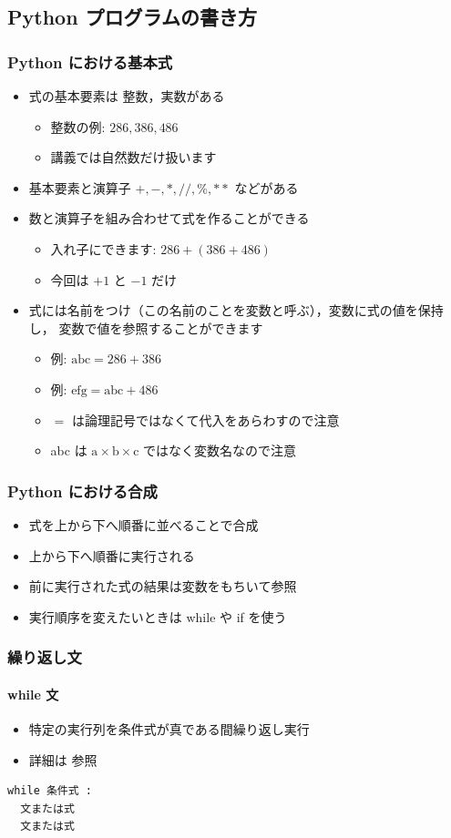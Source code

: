\subsection{Python プログラムの書き方}
\begin{frame}[fragile]
\frametitle{Python における基本式}
  \begin{itemize}
\item 式の基本要素は 整数，実数がある
    \begin{itemize}
\item 整数の例: \(286, 386, 486\) 
\item 講義では自然数だけ扱います
    \end{itemize}
\item 基本要素と演算子 \(+, -, *, \slash\slash, \%, **\) などがある
\item 数と演算子を組み合わせて式を作ることができる
    \begin{itemize}
\item 入れ子にできます: \(286+(386+486)\) 
\item 今回は \(+1\) と \(-1\) だけ
    \end{itemize}
\item 式には名前をつけ（この名前のことを変数と呼ぶ），変数に式の値を保持し，
変数で値を参照することができます
    \begin{itemize}
\item 例: \(\mbox{abc}=286+386\) 
\item 例: \(\mbox{efg}=\mbox{abc}+486\) 
\item $=$ は論理記号ではなくて代入をあらわすので注意
\item abc は \(\mbox{a}\times\mbox{b}\times\mbox{c}\) ではなく変数名なので注意
    \end{itemize}
  \end{itemize}
\end{frame}
\begin{frame}[label=composit]
\frametitle{Python における合成}
  \begin{itemize}
\item 式を上から下へ順番に並べることで合成
\item 上から下へ順番に実行される
\item 前に実行された式の結果は変数をもちいて参照
\item 実行順序を変えたいときは while や if を使う
  \end{itemize}
\end{frame}
\begin{frame}[fragile,label=while]
\frametitle{繰り返し文}
\framesubtitle{while 文}
  \begin{itemize}
\item 特定の実行列を条件式が真である間繰り返し実行
\item 詳細は \href{https://docs.python.org/ja/3/reference/compound_stmts.html#the-while-statement}{}参照
  \end{itemize}
  \begin{lstlisting}[caption={while 文}]
while 条件式 :
  文または式
  文または式
  
  \end{lstlisting}
\end{frame}
